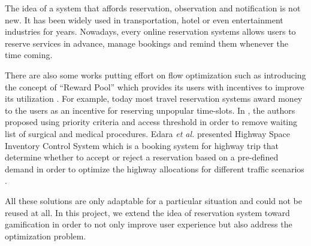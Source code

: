 The idea of a system that affords reservation, observation and notification is not new. It has been widely used in transportation, hotel or even entertainment industries for years. Nowadays, every online reservation systems allows users to reserve services in advance, manage bookings and remind them whenever the time coming. 

There are also some works putting effort on flow optimization such as introducing the concept of ``Reward Pool'' which provides its users with incentives to improve its utilization \cite{winand2006methods}. For example, today most travel reservation systems  award money to the users as an incentive for reserving unpopular time-slots. In \cite{gauld2000solving}, the authors proposed using priority criteria and access threshold in order to remove waiting list of surgical and medical procedures. Edara \emph{et al.} presented Highway Space Inventory Control System which is a booking system for highway trip that determine whether to accept or reject a reservation based on a pre-defined demand in order to optimize the highway allocations for different traffic scenarios \cite{edara2008model}. 

All these solutions are only adaptable for a particular situation and could not be reused at all. In this project, we extend the idea of reservation system toward gamification in order to not only improve user experience but also address the optimization problem.